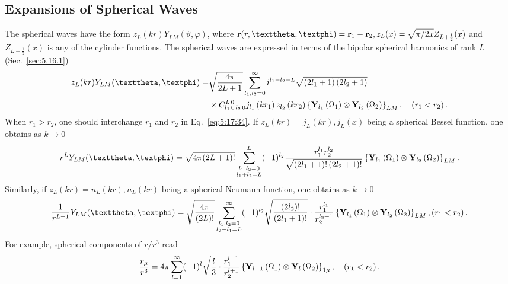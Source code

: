 \subsection{Expansions of Spherical Waves}\label{sec:5.17.6}
The spherical waves have the form $z_{L}(k r) Y_{L M}(\vartheta, \varphi)$, where $\vect{r}(r, \vartheta, \varphi)=\vect{r}_{1}-\vect{r}_{2}, z_{L}(x)=\sqrt{\pi / 2 x} Z_{L+\frac{1}{2}}(x)$ and $Z_{L+\frac{1}{2}}(x)$ is any of the cylinder functions. The spherical waves are expressed in terms of the bipolar spherical harmonics of rank $L$ \cite{ref070} (Sec.~\ref{sec:5.16.1})
\begin{align}
z_{L}(k r) Y_{L M}(\vartheta, \varphi)= & \sqrt{\frac{4 \pi}{2 L+1}} \sum_{l_{1}, l_{2}=0}^{\infty} i^{l_{1}-l_{2}-L} \sqrt{\left(2 l_{1}+1\right)\left(2 l_{2}+1\right)}  \notag\\
& \times \clebsch{l_{1}}{0}{l_{2}}{0}{L}{0} j_{l_{1}}\left(k r_{1}\right) z_{l_{2}}\left(k r_{2}\right)\left\{\vect{Y}_{l_{1}}\left(\Omega_{1}\right) \otimes \vect{Y}_{l_{2}}\left(\Omega_{2}\right)\right\}_{L M},\quad\left(r_{1}<r_{2}\right). \label{eq:5:17:34}
\end{align}
When $r_{1}>r_{2}$, one should interchange $r_{1}$ and $r_{2}$ in Eq.~\eqref{eq:5:17:34}. If $z_{L}(k r)=j_{L}(k r), j_{L}(x)$ being a spherical Bessel function, one obtains as $k \rightarrow 0$ \cite{ref022,ref096}
\begin{equation}
r^{L} Y_{L M}(\vartheta, \varphi)=\sqrt{4 \pi(2 L+1)!} \sum_{\substack{l_{1}, l_{2}=0 \\ l_{1}+l_{2}=L}}^{L}(-1)^{l_{2}} \frac{r_{1}^{l_{1}} r_{2}^{l_{2}}}{\sqrt{\left(2 l_{1}+1\right)!\left(2 l_{2}+1\right)!}}\left\{\vect{Y}_{l_{1}}\left(\Omega_{1}\right) \otimes \vect{Y}_{l_{2}}\left(\Omega_{2}\right)\right\}_{L M}. \label{eq:5:17:35}
\end{equation}
Similarly, if $z_{L}(k r)=n_{L}(k r), n_{L}(k r)$ being a spherical Neumann function, one obtains as $k \rightarrow 0$ \cite{ref022,ref096}
\begin{equation}
\frac{1}{r^{L+1}} Y_{L M}(\vartheta, \varphi)=\sqrt{\frac{4 \pi}{(2 L)!}} \sum_{\substack{l_{1}, l_{2}=0 \\ l_{2}-l_{1}=L}}^{\infty}(-1)^{l_{2}} \sqrt{\frac{\left(2 l_{2}\right)!}{\left(2 l_{1}+1\right)!}} \cdot \frac{r_{1}^{l_{1}}}{r_{2}^{l_{2}+1}}\left\{\vect{Y}_{l_{1}}\left(\Omega_{1}\right) \otimes \vect{Y}_{l_{2}}\left(\Omega_{2}\right)\right\}_{L M},\left(r_{1}<r_{2}\right). \label{eq:5:17:36}
\end{equation}
For example, spherical components of $r / r^{3}$ read
\begin{equation}
\frac{r_{\mu}}{r^{3}}=4 \pi \sum_{l=1}^{\infty}(-1)^{l} \sqrt{\frac{l}{3}} \cdot \frac{r_{1}^{l-1}}{r_{2}^{l+1}}\left\{\mathbf{Y}_{l-1}\left(\Omega_{1}\right) \otimes \mathbf{Y}_{l}\left(\Omega_{2}\right)\right\}_{1 \mu}, \quad\left(r_{1}<r_{2}\right). \label{eq:5:17:37}
\end{equation}
